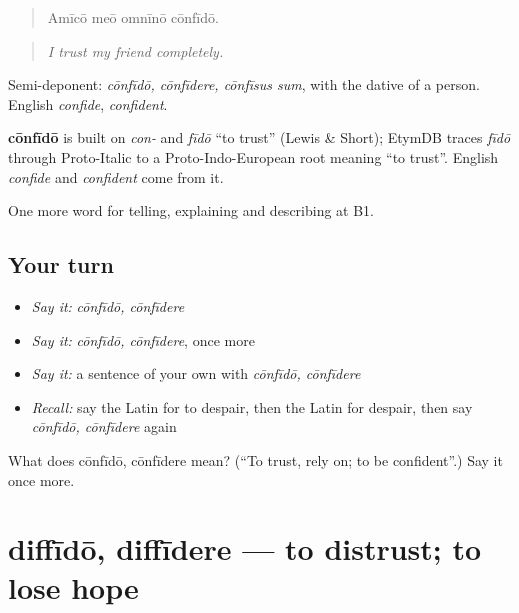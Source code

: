 \begin{quote}
Amīcō meō omnīnō cōnfīdō.
\end{quote}

\begin{quote}
\emph{I trust my friend completely.}
\end{quote}

Semi-deponent: \emph{cōnfīdō, cōnfīdere, cōnfīsus sum}, with the dative of a person. English \emph{confide}, \emph{confident}.

\begin{cousinweb}
\textbf{cōnfīdō} is built on \emph{con-} and \emph{fīdō} \textquotedblleft{}to trust\textquotedblright{} (Lewis \& Short); EtymDB traces \emph{fīdō} through Proto-Italic to a Proto-Indo-European root meaning \textquotedblleft{}to trust\textquotedblright{}. English \emph{confide} and \emph{confident} come from it.
\end{cousinweb}

\begin{grammarlens}[title={What you've built}]
One more word for telling, explaining and describing at B1.
\end{grammarlens}

\subsection*{Your turn}
\begin{itemize}
\raggedright
  \item \emph{Say it:} \emph{cōnfīdō, cōnfīdere}
  \item \emph{Say it:} \emph{cōnfīdō, cōnfīdere}, once more
  \item \emph{Say it:} a sentence of your own with \emph{cōnfīdō, cōnfīdere}
  \item \emph{Recall:} say the Latin for to despair, then the Latin for despair, then say \emph{cōnfīdō, cōnfīdere} again
\end{itemize}

\begin{tcolorbox}[breakable,colback=teal!4,colframe=teal!35!black,title={Before you move on}]
What does cōnfīdō, cōnfīdere mean? (\textquotedblleft{}To trust, rely on; to be confident\textquotedblright{}.) Say it once more.
\end{tcolorbox}
\section[diffīdō, diffīdere]{diffīdō, diffīdere — to distrust; to lose hope}

